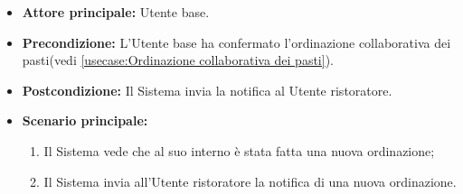 \label{usecase:Notifica ordine}
\begin{itemize}
	\item \textbf{Attore principale:} Utente base.
	
	\item \textbf{Precondizione:} L'Utente base ha confermato l'ordinazione collaborativa dei pasti(vedi \autoref{usecase:Ordinazione collaborativa dei pasti}).

	\item \textbf{Postcondizione:} Il Sistema invia la notifica al Utente ristoratore.
     
	\item \textbf{Scenario principale:}
	      \begin{enumerate}
                \item Il Sistema vede che al suo interno è stata fatta una nuova ordinazione;
                \item Il Sistema invia all'Utente ristoratore la notifica di una nuova ordinazione.
	      \end{enumerate}
\end{itemize}